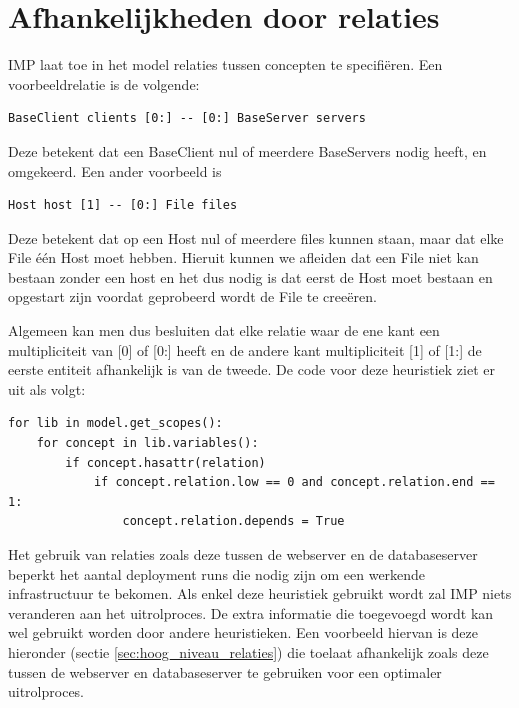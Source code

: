 \section{Afhankelijkheden door relaties}
\label{sec:relaties}
IMP laat toe in het model relaties tussen concepten te specifi\"eren.
Een voorbeeldrelatie is de volgende:
\begin{lstlisting}
BaseClient clients [0:] -- [0:] BaseServer servers
\end{lstlisting}
Deze betekent dat een BaseClient nul of meerdere BaseServers nodig heeft, en omgekeerd.
Een ander voorbeeld is 
\begin{lstlisting}
Host host [1] -- [0:] File files
\end{lstlisting}
Deze betekent dat op een Host nul of meerdere files kunnen staan, maar dat elke File \'e\'en Host moet hebben.
Hieruit kunnen we afleiden dat een File niet kan bestaan zonder een host en het dus nodig is dat eerst de Host moet bestaan en opgestart zijn voordat geprobeerd wordt de File te cree\"eren.

Algemeen kan men dus besluiten dat elke relatie waar de ene kant een multipliciteit van [0] of [0:] heeft en de andere kant multipliciteit [1] of [1:] de eerste entiteit afhankelijk is van de tweede.
De code voor deze heuristiek ziet er uit als volgt:

\begin{minipage}{\textwidth}
\begin{lstlisting}
for lib in model.get_scopes():
    for concept in lib.variables():
        if concept.hasattr(relation)
            if concept.relation.low == 0 and concept.relation.end == 1:
                concept.relation.depends = True
\end{lstlisting}
\end{minipage}

Het gebruik van relaties zoals deze tussen de webserver en de databaseserver beperkt het aantal deployment runs die nodig zijn om een werkende infrastructuur te bekomen.
Als enkel deze heuristiek gebruikt wordt zal IMP niets veranderen aan het uitrolproces.
De extra informatie die toegevoegd wordt kan wel gebruikt worden door andere heuristieken.
Een voorbeeld hiervan is deze hieronder (sectie \ref{sec:hoog_niveau_relaties}) die toelaat afhankelijk zoals deze tussen de webserver en databaseserver te gebruiken voor een optimaler uitrolproces.

